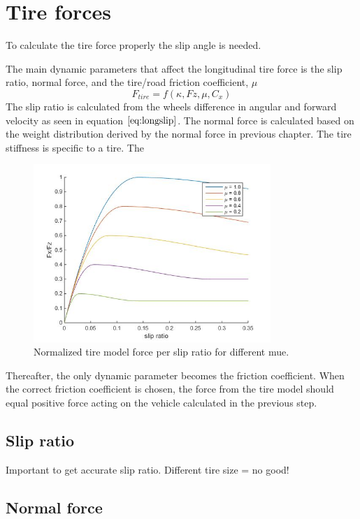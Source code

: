 \section{Tire forces}
To calculate the tire force properly the slip angle is needed. 

The main dynamic parameters that affect the longitudinal tire force is the slip ratio, normal force, and the tire/road friction coefficient, $ \mu $
\begin{equation}
F_{tire} = f(\kappa, Fz, \mu, C_{x})
\end{equation}
The slip ratio is calculated from the wheels difference in angular and forward velocity as seen in equation $ \ref{eq:longslip} $. The normal force is calculated based on the weight distribution derived by the normal force in previous chapter. The tire stiffness is specific to a tire. The 
\begin{figure}[h]
	\centering
	\includegraphics[width=0.8\textwidth]{Pictures/force_per_slip_different_mue}
	\caption {Normalized tire model force per slip ratio for different mue.}
	\label{force/slip}
\end{figure}

Thereafter, the only dynamic parameter becomes the friction coefficient. When the correct friction coefficient is chosen, the force from the tire model should equal positive force acting on the vehicle calculated in the previous step.

\subsection{Slip ratio}

Important to get accurate slip ratio. Different tire size = no good!

\subsection{Normal force}

